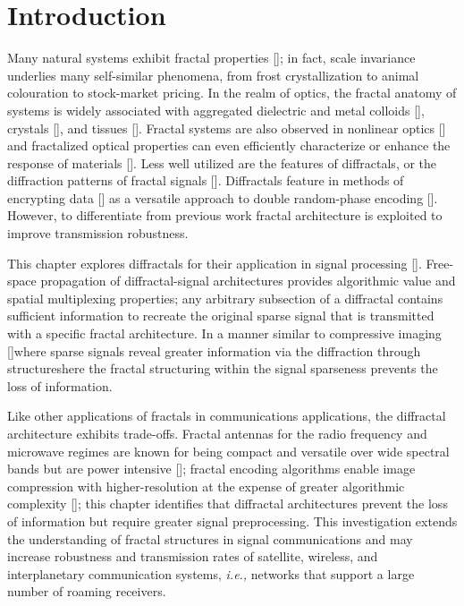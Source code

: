 \section{Introduction}
Many natural systems exhibit fractal properties [\cite{Mandlebrot}]; in fact, scale invariance underlies many self-similar phenomena, from frost crystallization to animal colouration to stock-market pricing. In the realm of optics, the fractal anatomy of systems is widely associated with aggregated dielectric and metal colloids [\cite{Sorensen}], crystals [\cite{Macke}], and tissues [\cite{Schmitt}]. Fractal systems are also observed in nonlinear optics [\cite{Soljacic, Segev}] and fractalized optical properties can even efficiently characterize or enhance the response of materials [\cite{Stockman, Tsai}]. Less well utilized are the features of diffractals, or the diffraction patterns of fractal signals  [\cite{Berry,Horvath,Hou}]. Diffractals feature in methods of encrypting data [\cite{Barrera}] as a versatile approach to double random-phase encoding [\cite{Unnikrishnan}]. However, to differentiate from previous work fractal architecture is exploited to improve transmission robustness.

This chapter explores diffractals for their application in signal processing [\cite{Verma,Verma2}]. Free-space propagation of diffractal-signal architectures provides algorithmic value and spatial multiplexing properties; any arbitrary subsection of a diffractal contains sufficient information to recreate the original sparse signal that is transmitted with a specific fractal architecture. In a manner similar to compressive imaging [\cite{Kelly07, Howland}]\textemdash where sparse signals reveal greater information via the diffraction through structures\textemdash here the fractal structuring within the signal sparseness prevents the loss of information.

Like other applications of fractals in communications applications, the diffractal architecture exhibits trade-offs. Fractal antennas for the radio frequency and microwave regimes are known for being compact and versatile over wide spectral bands but are power intensive [\cite{Radonic,Puente-Baliarda}]; fractal encoding algorithms enable image compression with higher-resolution at the expense of greater algorithmic complexity [\cite{Jacquin}]; this chapter identifies that diffractal architectures prevent the loss of information but require greater signal preprocessing.  This investigation extends the understanding of fractal structures in signal communications and may increase robustness and transmission rates of satellite, wireless, and interplanetary communication systems, {\it i.e.,} networks that support a large number of roaming receivers.


